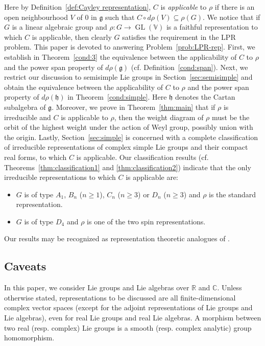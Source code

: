\documentclass[11pt,reqno]{amsart}
\DeclareMathOperator{\GL}{GL}
\begin{document}
Here by Definition~\ref{def:Cayley representation},  $C$ is \emph{applicable} to $\rho$ if there is an open neighbourhood $V$ of $0$ in $\mathfrak{g}$ such that $C \circ d\rho (V) \subseteq \rho (G)$.  We notice that if $G$ is a linear algebraic group and $\rho: G \to \GL(\mathbb{V})$ is a faithful representation to which $C$ is applicable,  then clearly $G$ satisfies the requirement in the LPR problem.  This paper is devoted to answering Problem~\ref{prob:LPR-rep}.  First,  we establish in Theorem~\ref{cond:3} the equivalence between the applicability of $C$ to $\rho$ and the power span property of  $d\rho (\mathfrak{g})$ (cf. Definition~\ref{cond:span}).  Next,  we restrict our discussion to semisimple Lie groups in Section~\ref{sec:semisimple} and obtain the equivalence between the applicability of $C$ to $\rho$ and the power span property of $d\rho (\mathfrak{h})$ in Theorem~\ref{cond:simple}.  Here $\mathfrak{h}$ denotes the Cartan subalgebra of $\mathfrak{g}$.  Moreover,  we prove in Theorem~\ref{thm:main} that if $\rho$ is irreducible and $C$ is applicable to $\rho$,  then the weight diagram of $\rho$ must be the orbit of the highest weight under the action of Weyl group,  possibly union with the origin.  Lastly,  Section~\ref{sec:simple} is concerned with a complete classification of irreducible representations of complex simple Lie groups and their compact real forms,  to which $C$ is applicable.  Our classification results (cf. Theorems~\ref{thm:classification1} and \ref{thm:classification2}) indicate that the only irreducible representations to which $C$ is applicable are: 
\begin{itemize} 
\item[$\diamond$] $G$ is of type $A_1$,  $B_n$ ($n\ge 1$),  $C_n$ ($n \ge 3$) or $D_n$ ($n \ge 3$) and $\rho$ is the standard representation.
\item[$\diamond$]  $G$ is of type $D_4$ and $\rho$ is one of the two spin representations.
\end{itemize}
Our results may be recognized as representation theoretic analogues of \cite[Theorem 1.31]{LPR06}. 

\subsection*{Caveats}
In this paper, we consider Lie groups and Lie algebras over $\mathbb{R}$ and $\mathbb{C}$.  Unless otherwise stated, representations to be discussed are all finite-dimensional complex vector spaces (except for the adjoint representations of Lie groups and Lie algebras),  even for real Lie groups and real Lie algebras.  A morphism between two real (resp.  complex) Lie groups is a smooth (resp.  complex analytic) group homomorphism.
\end{document}
